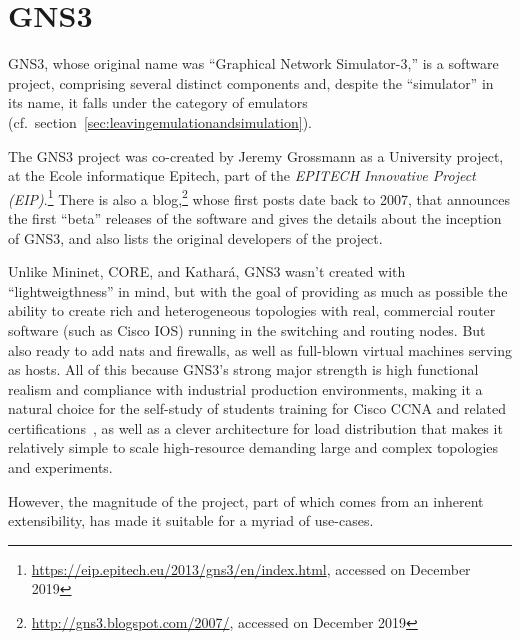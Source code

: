 \section{GNS3}
\label{sec:exemulgns3}

GNS3, whose original name was ``Graphical Network Simulator-3,'' is a software project, comprising several distinct components and, despite the ``simulator'' in its name, it falls under the category of emulators (cf.~section~\ref{sec:leavingemulationandsimulation}).

The GNS3 project was co-created by Jeremy Grossmann as a University project, at the Ecole informatique Epitech, part of the \emph{EPITECH Innovative Project (EIP)}.\footnote{\url{https://eip.epitech.eu/2013/gns3/en/index.html}, accessed on December 2019}
There is also a blog,\footnote{\url{http://gns3.blogspot.com/2007/}, accessed on December 2019} whose first posts date back to 2007, that announces the first ``beta'' releases of the software and gives the details about the inception of GNS3, and also lists the original developers of the project.

Unlike Mininet, CORE, and Kathará, GNS3 wasn't created with ``lightweigthness'' in mind, but with the goal of providing as much as possible the ability to create rich and heterogeneous topologies with real, commercial router software (such as Cisco IOS) running in the switching and routing nodes.
But also ready to add \glspl{nat} and firewalls, as well as full-blown virtual machines serving as hosts.
All of this because GNS3's strong major strength is high functional realism and compliance with industrial production environments, making it a natural choice for the self-study of students  training for Cisco CCNA and related certifications~\cite{thebookofgns3,gns3netsimguide}, as well as a clever architecture for load distribution that makes it relatively simple to scale high-resource demanding large and complex topologies and experiments.

However, the magnitude of the project, part of which comes from an inherent extensibility, has made it suitable for a myriad of use-cases.

